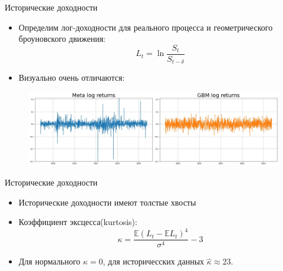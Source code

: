 \documentclass[aspectratio=169]{beamer}
\begin{document}
\begin{frame}{Исторические доходности}
    \begin{itemize}
        \item Определим лог-доходности для реального процесса и геометрического броуновского движения:
        $$
            L_t = \ln \dfrac{S_t}{S_{t-\delta}}
        $$
        \item Визуально очень отличаются:
    \end{itemize}
\begin{figure}
    \centering
    \includegraphics[width=1\linewidth]{6_figs/Meta Log returns plot.jpg}
    \label{fig:enter-label}
\end{figure}
\end{frame}
\begin{frame}{Исторические доходности}
    \begin{itemize}
        \item Исторические доходности имеют толстые хвосты
        \item Коэффициент эксцесса(kurtosis):
            $$
                \kappa = \dfrac{\mathbb{E}\left(L_t-\mathbb{E} L_t\right)^4}{\sigma^4} - 3
            $$
        \item Для нормального $\kappa = 0$, для историчесских данных $\hat{\kappa} \approx 23$. 
    \end{itemize}
    \centering
\end{frame}
\end{document}
